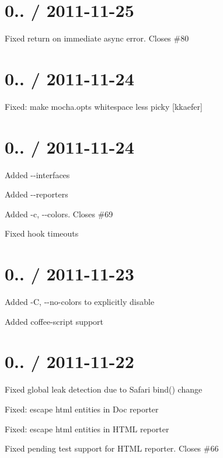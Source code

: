 \section*{0.. / 2011-\/11-\/25}


\begin{DoxyItemize}
\item Fixed return on immediate async error. Closes \#80
\end{DoxyItemize}

\section*{0.. / 2011-\/11-\/24}


\begin{DoxyItemize}
\item Fixed\+: make mocha.\+opts whitespace less picky \mbox{[}kkaefer\mbox{]}
\end{DoxyItemize}

\section*{0.. / 2011-\/11-\/24}


\begin{DoxyItemize}
\item Added {\ttfamily -\/-\/interfaces}
\item Added {\ttfamily -\/-\/reporters}
\item Added {\ttfamily -\/c, -\/-\/colors}. Closes \#69
\item Fixed hook timeouts
\end{DoxyItemize}

\section*{0.. / 2011-\/11-\/23}


\begin{DoxyItemize}
\item Added {\ttfamily -\/C, -\/-\/no-\/colors} to explicitly disable
\item Added coffee-\/script support
\end{DoxyItemize}

\section*{0.. / 2011-\/11-\/22}


\begin{DoxyItemize}
\item Fixed global leak detection due to Safari bind() change
\item Fixed\+: escape html entities in Doc reporter
\item Fixed\+: escape html entities in H\+T\+ML reporter
\item Fixed pending test support for H\+T\+ML reporter. Closes \#66
\end{DoxyItemize}


